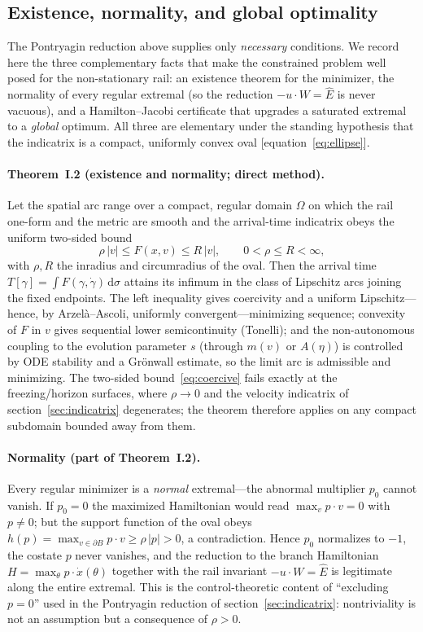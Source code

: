 \documentclass[12pt]{iopart}
\newcommand{\Ehat}{\hat E}
\newcommand{\dd}{\mathrm{d}}
\begin{document}
\subsection{Existence, normality, and global optimality}
\label{sec:control-foundations}
The Pontryagin reduction above supplies only \emph{necessary} conditions. We
record here the three complementary facts that make the constrained problem well
posed for the non-stationary rail: an existence theorem for the minimizer, the
normality of every regular extremal (so the reduction $-u\cdot W=\Ehat$ is never
vacuous), and a Hamilton--Jacobi certificate that upgrades a saturated extremal to
a \emph{global} optimum. All three are elementary under the standing hypothesis
that the indicatrix is a compact, uniformly convex oval [equation~\eqref{eq:ellipse}].

\paragraph{Theorem~I.2 (existence and normality; direct method).} Let the spatial arc range over a compact,
regular domain $\Omega$ on which the rail one-form and the metric are smooth and
the arrival-time indicatrix obeys the uniform two-sided bound
\begin{equation}
  \rho\,|v| \le F(x,v) \le R\,|v|, \qquad 0<\rho\le R<\infty,
  \label{eq:coercive}
\end{equation}
with $\rho,R$ the inradius and circumradius of the oval. Then the arrival time
$T[\gamma]=\int F(\gamma,\dot\gamma)\,\dd\sigma$ attains its infimum in the class
of Lipschitz arcs joining the fixed endpoints. The left inequality gives
coercivity and a uniform Lipschitz---hence, by Arzel\`a--Ascoli, uniformly
convergent---minimizing sequence; convexity of $F$ in $v$ gives sequential lower
semicontinuity (Tonelli); and the non-autonomous coupling to the evolution
parameter $s$ (through $m(v)$ or $A(\eta)$) is controlled by ODE stability and a
Gr\"onwall estimate, so the limit arc is admissible and minimizing. The two-sided
bound~\eqref{eq:coercive} fails exactly at the freezing/horizon surfaces, where
$\rho\to0$ and the velocity indicatrix of section~\ref{sec:indicatrix} degenerates; the
theorem therefore applies on any compact subdomain bounded away from them.

\paragraph{Normality (part of Theorem~I.2).} Every regular minimizer is a \emph{normal} extremal---the
abnormal multiplier $p_0$ cannot vanish. If $p_0=0$ the maximized Hamiltonian
would read $\max_v p\cdot v=0$ with $p\neq0$; but the support function of the oval
obeys $h(p)=\max_{v\in\partial B}p\cdot v\ge\rho\,|p|>0$, a contradiction. Hence
$p_0$ normalizes to $-1$, the costate $p$ never vanishes, and the reduction to the
branch Hamiltonian $H=\max_\theta p\cdot\dot x(\theta)$ together with the rail
invariant $-u\cdot W=\Ehat$ is legitimate along the entire extremal. This is the
control-theoretic content of ``excluding $p=0$'' used in the Pontryagin reduction
of section~\ref{sec:indicatrix}: nontriviality is not an assumption but a consequence
of $\rho>0$.
\end{document}
